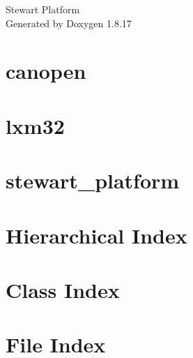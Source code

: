 \let\mypdfximage\pdfximage\def\pdfximage{\immediate\mypdfximage}\documentclass[twoside]{book}
\newcommand{\+}{\discretionary{\mbox{\scriptsize$\hookleftarrow$}}{}{}}
\newcommand{\clearemptydoublepage}{%
  \newpage{\pagestyle{empty}\cleardoublepage}%
}
\begin{document}
\hypersetup{pageanchor=false,
             bookmarksnumbered=true,
             pdfencoding=unicode
            }
\begin{titlepage}
\vspace*{7cm}
\begin{center}%
{\Large Stewart Platform }\\
\vspace*{1cm}
{\large Generated by Doxygen 1.8.17}\\
\end{center}
\end{titlepage}
\clearemptydoublepage
{}
\tableofcontents
\clearemptydoublepage
{}
\hypersetup{pageanchor=true}

\chapter{canopen}
\label{md__home_adev__documents__s_t_e_c_h_stewart_platform_lib_lxm32_lib_canopen__r_e_a_d_m_e}

\chapter{lxm32}
\label{md__home_adev__documents__s_t_e_c_h_stewart_platform_lib_lxm32__r_e_a_d_m_e}

\chapter{stewart\+\_\+platform}
\label{md__home_adev__documents__s_t_e_c_h_stewart_platform__r_e_a_d_m_e}

\chapter{Hierarchical Index}

\chapter{Class Index}

\chapter{File Index}

\end{document}
